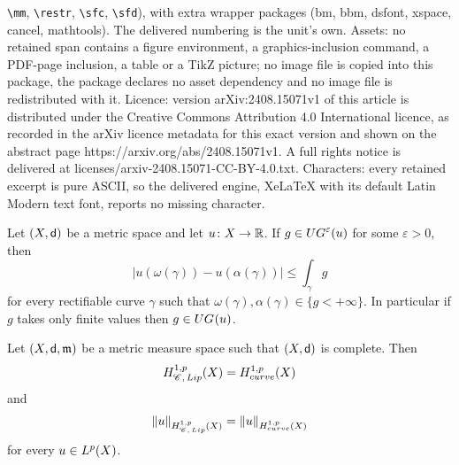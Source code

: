 \documentclass[10pt,a4paper]{amsart}
\newcommand{\Chain}[1]{\mathscr{C}^{#1}}
\newcommand{\HH}[2]{H^{1,#1}_{{\rm #2}}}
\newcommand{\Lip}{{\rm Lip}}
\newcommand{\R}{\mathbb{R}}
\newcommand{\UG}[1]{{\rm UG}^{#1}}
\newcommand{\X}{{\rm X}}
\newcommand{\mm}{\mathfrak m}
\newcommand{\sfd}{{\sf d}}
\begin{document}
\texttt{\textbackslash mm}, \texttt{\textbackslash restr}, \texttt{\textbackslash sfc}, \texttt{\textbackslash sfd}), with extra wrapper packages (bm, bbm, dsfont, xspace, cancel, mathtools). The delivered numbering is the unit's own. Assets: no retained span contains a figure environment, a graphics-inclusion command, a PDF-page inclusion, a table or a TikZ picture; no image file is copied into this package, the package declares no asset dependency and no image file is redistributed with it. Licence: version arXiv:2408.15071v1 of this article is distributed under the Creative Commons Attribution 4.0 International licence, as recorded in the arXiv licence metadata for this exact version and shown on the abstract page https://arxiv.org/abs/2408.15071v1. A full rights notice is delivered at licenses/arxiv-2408.15071-CC-BY-4.0.txt. Characters: every retained excerpt is pure ASCII, so the delivered engine, XeLaTeX with its default Latin Modern text font, reports no missing character.
\begin{proposition}
\label{prop:UGeta_subset_UG}
    Let $(\X,\sfd)$ be a metric space and let $u\colon \X \to \R$. If $g\in \UG{\varepsilon}(u)$ for some $\varepsilon >0$, then 
    \begin{equation}
    \label{eq:UG_inequality}
        \vert u(\omega(\gamma)) - u(\alpha(\gamma)) \vert \le \int_\gamma g
    \end{equation}
    for every rectifiable curve $\gamma$ such that $\omega(\gamma), \alpha(\gamma) \in \{g < +\infty \}$. In particular if $g$ takes only finite values then $g \in \UG{}(u)$.
\end{proposition}

\begin{theorem}
    \label{theo:density_energy_complete}
    Let $(\X,\sfd,\mm)$ be a metric measure space such that $(\X,\sfd)$ is complete. Then \begin{equation}
        \HH{p}{\Chain{},\, \Lip}(\X) = \HH{p}{curve}(\X)
    \end{equation}
    and
    \begin{equation}
        \|u \|_{\HH{p}{\Chain{},\, \Lip}(\X)}  = \|u \|_{\HH{p}{curve}(\X)}
    \end{equation}
    for every $u\in L^p(\X)$.
\end{theorem}
\end{document}
